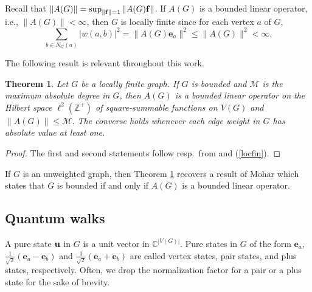 \documentclass[12pt,a4paper]{article}
\newtheorem{thm}{Theorem}
\def \e {{\bf e}}
\def \u {{\bf u}}
\def \f {{\bf f}}
\def \e {{\mathbf e}}
\newcommand{\ob}[1]{\left(#1\right)}
\begin{document}
Recall that $\|A(G)\|=\sup_{\|\f\|=1}\|A(G)\f\|$. If $A(G)$ is a bounded linear operator, %
i.e., $\|A(G)\|<\infty$, then $G$ is locally finite since for each vertex $a$ of $G$,
\begin{equation}
\label{locfin}
\sum_{b \in N_G(a)} |w(a,b)|^2=\|A(G)\e_a\|^2\leq \|A(G)\|^2<\infty.
\end{equation}

The following result is relevant throughout this work.

\begin{thm}
\label{infg}
Let $G$ be a locally finite graph. If $G$ is bounded and $\mathcal{M}$ is the maximum absolute degree in $G$, then $A(G)$ is a bounded linear operator on the Hilbert space $\ell^2(\mathbb{Z}^+)$ of square-summable functions on $V(G)$ and $\|A(G)\|\leq\mathcal{M}$. The converse holds whenever each edge weight in $G$ has absolute value at least one. 
\end{thm}

\begin{proof}
The first and second statements follow resp.\ from \cite[Theorem 6.12-A]{taylor1958introduction} and (\ref{locfin}).
\end{proof}

If $G$ is an unweighted graph, then Theorem \ref{infg} recovers a result of Mohar \cite[Theorem 3.2]{mohar1982spectrum} which states that $G$ is bounded if and only if $A(G)$ is a bounded linear operator. %


\subsection{Quantum walks}

A pure state $\u$ in $G$ is a unit vector in $\mathbb{C}^{|V(G)|}.$ Pure states in $G$ of the form $\e_a$, $\frac{1}{\sqrt{2}}\ob{\e_a-\e_b}$ and $\frac{1}{\sqrt{2}}\ob{\e_a+\e_b}$ are called vertex states, pair states, and plus states, respectively. Often, we drop the normalization factor for a pair or a plus state for the sake of brevity.
\end{document}
